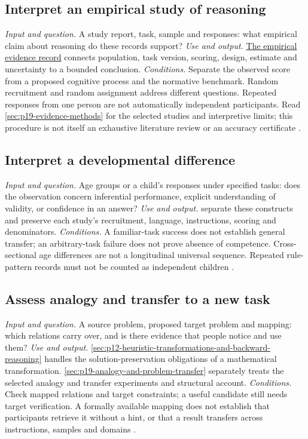 \subsection{Interpret an empirical study of reasoning}
\label{sec:p14-finder-empirical}
\textit{Input and question.} A study report, task, sample and responses:
what empirical claim about reasoning do these records support?
\textit{Use and output.}
\hyperref[def:p19-evidence-record]{The empirical evidence record} connects
population, task version, scoring, design, estimate and uncertainty to a
bounded conclusion.
\textit{Conditions.} Separate the observed score from a proposed cognitive
process and the normative benchmark. Random recruitment and random assignment
address different questions. Repeated responses from one person are not
automatically independent participants. Read
\cref{sec:p19-evidence-methods} for the selected studies and interpretive
limits; this procedure is not itself an exhaustive literature review or an
accuracy certificate \cite[pp.~131--132]{WassersteinLazar2016ASA}.

\subsection{Interpret a developmental difference}
\label{sec:p14-finder-development}
\textit{Input and question.} Age groups or a child's responses under
specified tasks: does the observation concern inferential performance,
explicit understanding of validity, or confidence in an answer?
\textit{Use and output.}  separate these constructs and preserve each
study's recruitment, language, instructions, scoring and denominators.
\textit{Conditions.} A familiar-task success does not establish general
transfer; an arbitrary-task failure does not prove absence of competence.
Cross-sectional age differences are not a longitudinal universal sequence.
Repeated rule-pattern records must not be counted as independent children
\cite{Markovits2021DevelopmentRationality}.

\subsection{Assess analogy and transfer to a new task}
\label{sec:p14-finder-transfer}
\textit{Input and question.} A source problem, proposed target problem and
mapping: which relations carry over, and is there evidence that people notice
and use them?
\textit{Use and output.}
\cref{sec:p12-heuristic-transformations-and-backward-reasoning} handles the
solution-preservation obligations of a mathematical transformation.
\cref{sec:p19-analogy-and-problem-transfer} separately treats the selected
analogy and transfer experiments and structural account.
\textit{Conditions.} Check mapped relations and target constraints; a useful
candidate still needs target verification. A formally available mapping does
not establish that participants retrieve it without a hint, or that a result
transfers across instructions, samples and domains
\cite{GickHolyoak1980AnalogicalProblemSolving,Gentner1983StructureMapping}.

